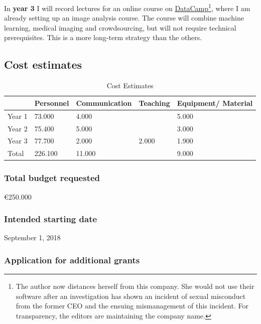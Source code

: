 \documentclass[serif, twocolumn, numeric, rga]{jote-article}
\begin{document}
In \textbf{year 3} I will record lectures for an online course on \href{http://www.datacamp.com}{DataCamp}\footnote{The author now distances herself from this company. She would not use   their software after an investigation has shown an incident of sexual   misconduct from the former CEO and the ensuing mismanagement of this   incident. For transparency, the editors are maintaining the company   name.}, where I am already setting up an image analysis course. The course will combine machine learning, medical imaging and crowdsourcing, but will not require technical prerequisites. This is a more long-term strategy than the others.


\subsection*{Cost estimates}
\begin{table}[h] \sffamily
\begin{tabular}{lp{}p{}p{}l}
\toprule
       & Personnel & Communication\footnotemark & Teaching & Equipment/ Material \\ \midrule
Year 1 & 73.000    & 4.000 &          & 5.000              \\
Year 2 & 75.400    & 5.000  &          & 3.000              \\
Year 3 & 77.700    & 2.000  & 2.000    & 1.900              \\
Total  & 226.100   & 11.000 &          & 9.000             \\ \bottomrule
\end{tabular}
\caption{Cost Estimates}
\label{tab:table4}
\vspace{-\baselineskip}
\end{table}


\subsubsection*{Total budget requested}

€250.000 

\subsubsection*{Intended starting date}

September 1, 2018 
\subsubsection*{Application for additional grants}
\end{document}
